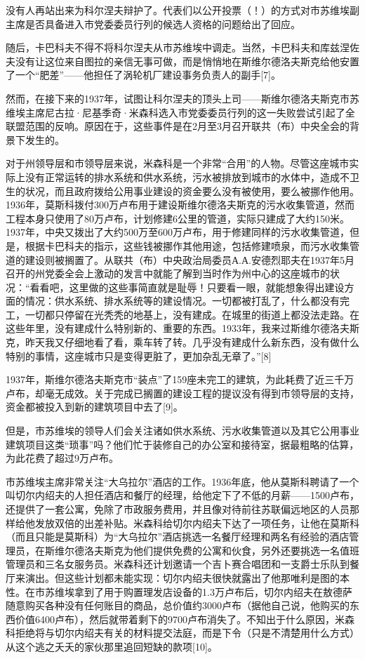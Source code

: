 没有人再站出来为科尔涅夫辩护了。代表们以公开投票（！）的方式对市苏维埃副主席是否具备进入市党委委员行列的候选人资格的问题给出了回应。

随后，卡巴科夫不得不将科尔涅夫从市苏维埃中调走。当然，卡巴科夫和库兹涅佐夫没有让这位来自图拉的亲信无事可做，而是悄悄地在斯维尔德洛夫斯克给他安置了一个“肥差”——他担任了涡轮机厂建设事务负责人的副手[7]。

然而，在接下来的1937年，试图让科尔涅夫的顶头上司——斯维尔德洛夫斯克市苏维埃主席尼古拉·尼基季奇·米森科选入市党委委员行列的这一失败尝试引起了全联盟范围的反响。原因在于，这些事件是在2月至3月召开联共（布）中央全会的背景下发生的。

对于州领导层和市领导层来说，米森科是一个非常“合用”的人物。尽管这座城市实际上没有正常运转的排水系统和供水系统，污水被排放到城市的水体中，造成不卫生的状况，而且政府拨给公用事业建设的资金要么没有被使用，要么被挪作他用。1936年，莫斯科拨付300万卢布用于建设斯维尔德洛夫斯克的污水收集管道，然而工程本身只使用了80万卢布，计划修建6公里的管道，实际只建成了大约150米。1937年，中央又拨出了大约500万至600万卢布，用于修建同样的污水收集管道，但是，根据卡巴科夫的指示，这些钱被挪作其他用途，包括修建喷泉，而污水收集管道的建设则被搁置了。从联共（布）中央政治局委员А.А.安德烈耶夫在1937年5月召开的州党委全会上激动的发言中就能了解到当时作为州中心的这座城市的状况：“看看吧，这里做的这些事简直就是耻辱！只要看一眼，就能想象得出建设方面的情况：供水系统、排水系统等的建设情况。一切都被打乱了，什么都没有完工，一切都只停留在光秃秃的地基上，没有建成。在城里的街道上都没法走路。在这些年里，没有建成什么特别新的、重要的东西。1933年，我来过斯维尔德洛夫斯克，昨天我又仔细地看了看，乘车转了转。几乎没有建成什么新东西，没有做什么特别的事情，这座城市只是变得更脏了，更加杂乱无章了。”[8]

1937年，斯维尔德洛夫斯克市“装点”了159座未完工的建筑，为此耗费了近三千万卢布，却毫无成效。关于完成已搁置的建设工程的提议没有得到市领导层的支持，资金都被投入到新的建筑项目中去了[9]。

但是，市苏维埃的领导人们会关注诸如供水系统、污水收集管道以及其它公用事业建筑项目这类“琐事”吗？他们忙于装修自己的办公室和接待室，据最粗略的估算，为此花费了超过9万卢布。

市苏维埃主席非常关注“大乌拉尔”酒店的工作。1936年底，他从莫斯科聘请了一个叫切尔内绍夫的人担任酒店和餐厅的经理，给他定下了不低的月薪——1500卢布，还提供了一套公寓，免除了市政服务费用，并且像对待前往苏联偏远地区的人员那样给他发放双倍的出差补贴。米森科给切尔内绍夫下达了一项任务，让他在莫斯科（而且只能是莫斯科）为“大乌拉尔”酒店挑选一名餐厅经理和两名有经验的酒店管理员，在斯维尔德洛夫斯克为他们提供免费的公寓和伙食，另外还要挑选一名值班管理员和三名女服务员。米森科还计划邀请一个吉卜赛合唱团和一支爵士乐队到餐厅来演出。但这些计划都未能实现：切尔内绍夫很快就露出了他那唯利是图的本性。在市苏维埃拿到了用于购置理发店设备的1.3万卢布后，切尔内绍夫在敖德萨随意购买各种没有任何账目的商品，总价值约3000卢布（据他自己说，他购买的东西价值6400卢布），然后就带着剩下的9700卢布消失了。不知出于什么原因，米森科拒绝将与切尔内绍夫有关的材料提交法庭，而是下令（只是不清楚用什么方式）从这个逃之夭夭的家伙那里追回短缺的款项[10]。

